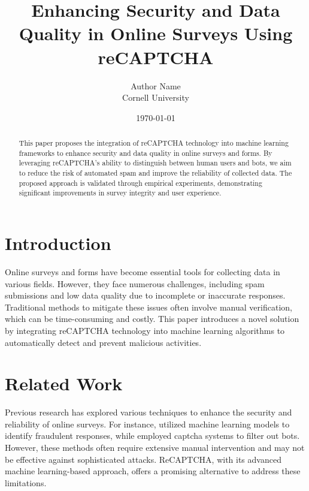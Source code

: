 \documentclass{article}
\begin{document}
\title{Enhancing Security and Data Quality in Online Surveys Using reCAPTCHA}
\author{Author Name \\ Cornell University}
\date{\today}
\maketitle

\begin{abstract}
This paper proposes the integration of reCAPTCHA technology into machine learning frameworks to enhance security and data quality in online surveys and forms. By leveraging reCAPTCHA's ability to distinguish between human users and bots, we aim to reduce the risk of automated spam and improve the reliability of collected data. The proposed approach is validated through empirical experiments, demonstrating significant improvements in survey integrity and user experience.
\end{abstract}

\section{Introduction}
Online surveys and forms have become essential tools for collecting data in various fields. However, they face numerous challenges, including spam submissions and low data quality due to incomplete or inaccurate responses. Traditional methods to mitigate these issues often involve manual verification, which can be time-consuming and costly. This paper introduces a novel solution by integrating reCAPTCHA technology into machine learning algorithms to automatically detect and prevent malicious activities.

\section{Related Work}
Previous research has explored various techniques to enhance the security and reliability of online surveys. For instance, \cite{ref1} utilized machine learning models to identify fraudulent responses, while \cite{ref2} employed captcha systems to filter out bots. However, these methods often require extensive manual intervention and may not be effective against sophisticated attacks. ReCAPTCHA, with its advanced machine learning-based approach, offers a promising alternative to address these limitations.
\end{document}
